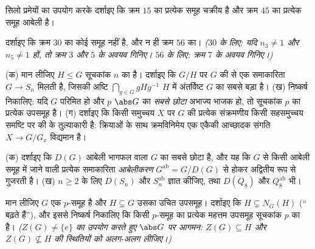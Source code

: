 \begin{exercise}[$\star$]\label{exo:b3:groups:6}
सिलो प्रमेयों का उपयोग करके दर्शाइए कि क्रम $15$ का प्रत्येक
समूह चक्रीय है और क्रम $45$ का प्रत्येक समूह आबेली है।
\end{exercise}

\begin{exercise}[$\star\star$]\label{exo:b3:groups:7}
दर्शाइए कि क्रम $30$ का कोई समूह  नहीं है, और न ही क्रम
$56$ का। \emph{($30$ के लिए: यदि $n_3 \neq 1$ और $n_5 \neq 1$ हों, तो क्रम
$3$ और $5$ के अवयव गिनिए। $56$ के लिए: क्रम $7$ के अवयव
गिनिए।)}
\end{exercise}

\begin{exercise}[$\star\star$]\label{exo:b3:groups:8}
(क) मान लीजिए $H \leq G$ सूचकांक $n$ का है। दर्शाइए कि $G/H$ पर
$G$ की  से एक समाकारिता $G \to S_n$ मिलती है, जिसकी अष्टि
$\bigcap_{g \in
G} gHg^{-1}$ $H$ में अंतर्विष्ट $G$ का सबसे बड़ा 
है।
(ख) निष्कर्ष निकालिए: यदि $G$ परिमित हो और $p$ $\abs G$ का
\emph{सबसे छोटा} अभाज्य भाजक हो, तो सूचकांक $p$ का प्रत्येक
उपसमूह  है।
(ग) दर्शाइए कि किसी समुच्चय $X$ पर $G$ की प्रत्येक
संक्रमणीय  किसी सहसमुच्चय समष्टि पर की  के
तुल्याकारी है: क्रियाओं के साथ क्रमविनिमेय एक एकैकी आच्छादक संगति
$X
\to G/G_x$ विद्यमान है।
\end{exercise}

\begin{exercise}[$\star\star$]\label{exo:b3:groups:9}
(क) दर्शाइए कि $D(G)$ आबेली भागफल वाला $G$ का सबसे छोटा
 है, और यह कि $G$ से किसी आबेली समूह में जाने
वाली प्रत्येक समाकारिता \emph{आबेलीकरण} $G^{\mathrm{ab}} = G/D(G)$ से होकर
अद्वितीय रूप से गुजरती है।
(ख) $n \geq 2$ के लिए $D(S_n)$ और $S_n^{\mathrm{ab}}$ ज्ञात कीजिए, तथा $D(Q_8)$ और
$Q_8^{\mathrm{ab}}$ भी।
\end{exercise}

\begin{exercise}[$\star\star$]\label{exo:b3:groups:10}
मान लीजिए $G$ एक $p$-समूह है और $H \subsetneq G$ उसका उचित उपसमूह।
दर्शाइए कि $H \subsetneq N_G(H)$ (`` बढ़ते हैं''), और इससे निष्कर्ष
निकालिए कि किसी $p$-समूह का प्रत्येक महत्तम उपसमूह सूचकांक
$p$ का  है। \emph{($Z(G) \neq \{e\}$ का उपयोग करते हुए
$\abs G$ पर आगमन: $Z(G) \subseteq H$ और $Z(G) \not\subseteq H$ की स्थितियों को अलग-अलग लीजिए।)}
\end{exercise}

